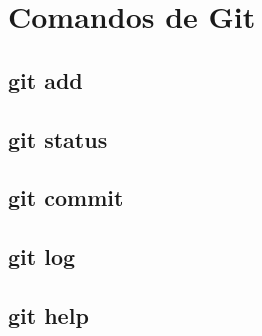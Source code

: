 \section{Comandos de Git}

\subsection{git add}

\subsection{git status}

\subsection{git commit}

\subsection{git log}

\subsection{git help}